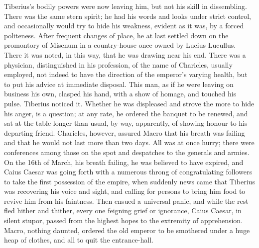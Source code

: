 
Tiberius's bodily powers were now leaving him, but not his skill in dissembling. There was the same stern spirit; he had his words and looks under strict control, and occasionally would try to hide his weakness, evident as it was, by a forced politeness. After frequent changes of place, he at last settled down on the promontory of Misenum in a country-house once owned by Lucius Lucullus. There it was noted, in this way, that he was drawing near his end. There was a physician, distinguished in his profession, of the name of Charicles, usually employed, not indeed to have the direction of the emperor's varying health, but to put his advice at immediate disposal. This man, as if he were leaving on business his own, clasped his hand, with a show of homage, and touched his pulse. Tiberius noticed it. Whether he was displeased and strove the more to hide his anger, is a question; at any rate, he ordered the banquet to be renewed, and sat at the table longer than usual, by way, apparently, of showing honour to his departing friend. Charicles, however, assured Macro that his breath was failing and that he would not last more than two days. All was at once hurry; there were conferences among those on the spot and despatches to the generals and armies. On the 16th of March, his breath failing, he was believed to have expired, and Caius Caesar was going forth with a numerous throng of congratulating followers to take the first possession of the empire, when suddenly news came that Tiberius was recovering his voice and sight, and calling for persons to bring him food to revive him from his faintness. Then ensued a universal panic, and while the rest fled hither and thither, every one feigning grief or ignorance, Caius Caesar, in silent stupor, passed from the highest hopes to the extremity of apprehension. Macro, nothing daunted, ordered the old emperor to be smothered under a huge heap of clothes, and all to quit the entrance-hall.


